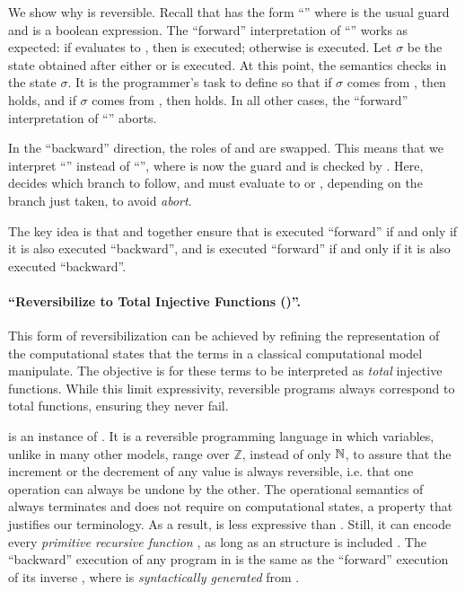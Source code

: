 \begin{example}
We show why \JANUS {} is reversible.
Recall that \JANUS {} has the form
``'' where  is the usual guard and  is a boolean expression.
The ``forward'' interpretation of ``'' works as expected: if  evaluates to , then  is executed; otherwise  is executed.
Let $\sigma$ be the state obtained after either  or  is executed. At this point, the \JANUS semantics checks  in the state $\sigma$.
It is the programmer’s task to define  so that if $\sigma$ comes from , then  holds, and if $\sigma$ comes from , then  holds. In all other cases, the ``forward'' interpretation of ``'' aborts.

In the ``backward'' direction, the roles of  and  are swapped. This means that we interpret ``'' instead of ``'', where  is now the guard and  is checked by .
Here,  decides which branch to follow, and  must evaluate to  or , depending on the branch just taken, to avoid \emph{abort}.

The key idea is that  and  together ensure that
 is executed ``forward'' if and only if it is also executed ``backward'', and
 is executed ``forward'' if and only if it is also executed ``backward''.
\end{example}

\paragraph{``Reversibilize to Total Injective Functions (\TIF)''.}
This form of reversibilization can be achieved by refining the representation of the computational states that the terms in a classical computational model manipulate. The objective is for these terms to be interpreted as \emph{total} injective functions. While this limit expressivity, reversible programs always correspond to total functions, ensuring they never fail.


\SRL \cite{MATOS:TCS15} is an instance of \TIF. It is a reversible programming language in which variables, unlike in many other models, range over $\mathbb{Z}$, instead of only $\mathbb{N}$, to assure that the increment or the decrement of any value is always reversible, i.e.\! that one operation can always be undone by the other.
The operational semantics of \SRL always terminates and does not require  on computational states, a property that justifies our terminology. As a result, \SRL is less expressive than \JANUS. Still, it can encode every \emph{primitive recursive function} \cite{MalettoR:JLAMP24}, as long as an  structure is included \cite{MatosPR:RC20}.
The ``backward'' execution of any program  in \SRL is the same as the ``forward'' execution of its inverse , where  is \emph{syntactically generated} from .

